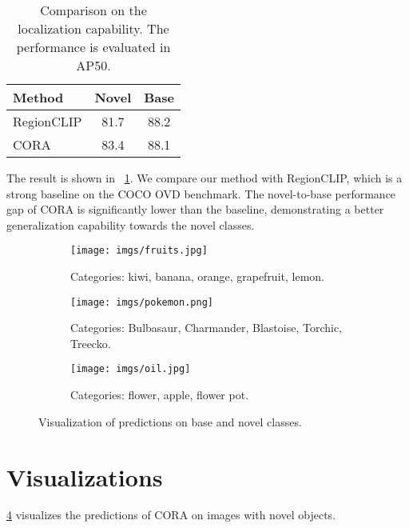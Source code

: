 \documentclass[10pt,twocolumn,letterpaper]{article}
\begin{document}
\begin{table}[h]
\centering
\begin{tabular}{l|cc}
\toprule
Method        & Novel & {\color[HTML]{C0C0C0}Base}                        \\
\midrule
RegionCLIP               &  81.7 & {\color[HTML]{C0C0C0}88.2} \\
CORA     & 83.4  & {\color[HTML]{C0C0C0}88.1} \\
\bottomrule
\end{tabular}
\caption{Comparison on the localization capability. The performance is evaluated in AP50.}
\label{tab:loc}
\end{table} The result is shown in ~\cref{tab:loc}.
We compare our method with RegionCLIP, which is a strong baseline on the COCO OVD benchmark.
The novel-to-base performance gap of CORA is significantly lower than the baseline, demonstrating a better generalization capability towards the novel classes.

\begin{figure}
  \centering
  \begin{subfigure}{0.95\linewidth}
    \texttt{[image: imgs/fruits.jpg]}
    \caption{Categories: kiwi, banana, orange, grapefruit, lemon.}
    \label{fig:fruit}
  \end{subfigure}
  \hfill
  \begin{subfigure}{0.95\linewidth}
    \texttt{[image: imgs/pokemon.png]}
    \caption{Categories: Bulbasaur, Charmander, Blastoise, Torchic, Treecko.}
    \label{fig:pokemon}
  \end{subfigure}
  \hfill
  \begin{subfigure}{0.95\linewidth}
    \texttt{[image: imgs/oil.jpg]}
    \caption{Categories: flower, apple, flower pot.}
    \label{fig:oil}
  \end{subfigure}
  \caption{Visualization of predictions on base and novel classes.}
  \label{fig:vis}
\end{figure}

\section{Visualizations}
\cref{fig:vis} visualizes the predictions of CORA on images with novel objects. 
\end{document}
